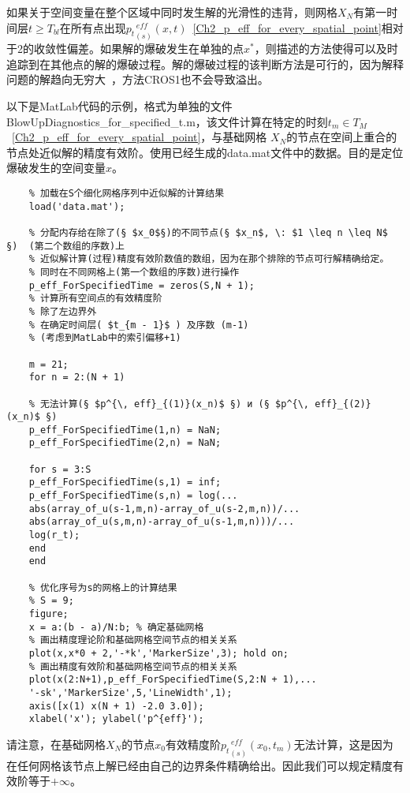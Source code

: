 \documentclass[twoside]{book}
\begin{document}
\begin{CJK*}{GBK}{song}
	如果关于空间变量在整个区域中同时发生解的光滑性的违背，则网格$X_N$有第一时间层$t \geqslant T_{bl}$在所有点出现${p_t}_{(s)}^{\, eff}(x,t)$~\eqref{Ch2_p_eff_for_every_spatial_point}相对于2的收敛性偏差。如果解的爆破发生在单独的点$x^*$，则描述的方法使得可以及时追踪到在其他点的解的爆破过程。解的爆破过程的该判断方法是可行的，因为解释问题的解趋向无穷大~\cite{BUE_basic_1,BUE_basic_2}，方法CROS1也不会导致溢出。



	以下是MatLab代码的示例，格式为单独的文件BlowUpDiagnostics\_for\_specified\_t.m，该文件计算在特定的时刻$t_m \in T_M$~\eqref{Ch2_p_eff_for_every_spatial_point}，与基础网格 $X_N$的节点在空间上重合的节点处近似解的精度有效阶。使用已经生成的data.mat文件中的数据。目的是定位爆破发生的空间变量$x$。
\begin{framed}
	\begin{lstlisting}
	% 加载在S个细化网格序列中近似解的计算结果
	load('data.mat');
	
	% 分配内存给在除了(§ $x_0$§)的不同节点(§ $x_n$, \: $1 \leq n \leq N$ §)  (第二个数组的序数)上
	% 近似解计算(过程)精度有效阶数值的数组，因为在那个排除的节点可行解精确给定。
	% 同时在不同网格上(第一个数组的序数)进行操作
	p_eff_ForSpecifiedTime = zeros(S,N + 1);	
	% 计算所有空间点的有效精度阶
	% 除了左边界外
	% 在确定时间层( $t_{m - 1}$ ) 及序数 (m-1)
	% (考虑到MatLab中的索引偏移+1)

	m = 21;
	for n = 2:(N + 1)
	
	% 无法计算(§ $p^{\, eff}_{(1)}(x_n)$ §) и (§ $p^{\, eff}_{(2)}(x_n)$ §)
	p_eff_ForSpecifiedTime(1,n) = NaN;
	p_eff_ForSpecifiedTime(2,n) = NaN;
	
	for s = 3:S
	p_eff_ForSpecifiedTime(s,1) = inf;
	p_eff_ForSpecifiedTime(s,n) = log(...
	abs(array_of_u(s-1,m,n)-array_of_u(s-2,m,n))/...
	abs(array_of_u(s,m,n)-array_of_u(s-1,m,n)))/...
	log(r_t);
	end
	end
	
	% 优化序号为s的网格上的计算结果
	% S = 9;
	figure;
	x = a:(b - a)/N:b; % 确定基础网格
	% 画出精度理论阶和基础网格空间节点的相关关系
	plot(x,x*0 + 2,'-*k','MarkerSize',3); hold on;
	% 画出精度有效阶和基础网格空间节点的相关关系
	plot(x(2:N+1),p_eff_ForSpecifiedTime(S,2:N + 1),...
	'-sk','MarkerSize',5,'LineWidth',1);
	axis([x(1) x(N + 1) -2.0 3.0]);
	xlabel('x'); ylabel('p^{eff}');
	\end{lstlisting}
\end{framed}
	
	请注意，在基础网格$X_N$的节点$x_0$有效精度阶${p_t}_{(s)}^{\, eff}(x_0,t_m)$无法计算，这是因为在任何网格该节点上解已经由自己的边界条件精确给出。因此我们可以规定精度有效阶等于$+\infty$。
	

\end{CJK*}
\end{document}
